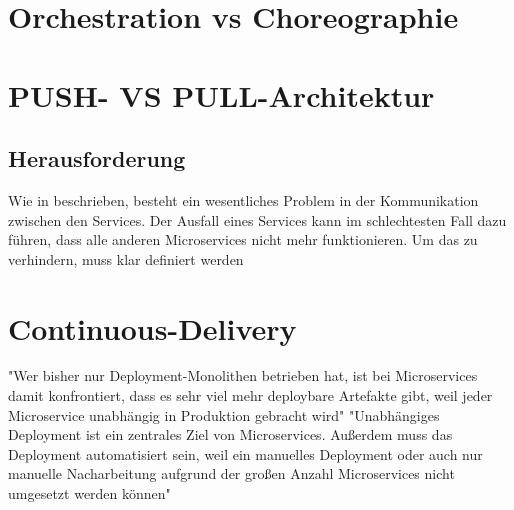 \section{Orchestration vs Choreographie}
\label{sec:orchestrationvschoreographie}

\section{PUSH- VS PULL-Architektur}
\label{sec:PushPullArchitektur}

\subsection{Herausforderung}
Wie in \cite[S. 25]{EWolff2016:Microservices} beschrieben, besteht ein wesentliches Problem in der Kommunikation zwischen den Services. Der Ausfall eines Services kann im schlechtesten Fall dazu führen, dass alle anderen Microservices nicht mehr funktionieren. Um das zu verhindern, muss klar definiert werden


\section{Continuous-Delivery}
\label{sec:ContinuousDelivery}
"Wer bisher nur Deployment-Monolithen betrieben hat, ist bei Microservices damit konfrontiert, dass es sehr viel mehr deploybare Artefakte gibt, weil jeder Microservice unabhängig in Produktion gebracht wird"\cite[S. 241]{EWolff2016:Microservices}
"Unabhängiges Deployment ist ein zentrales Ziel von Microservices. Außerdem muss das Deployment automatisiert sein, weil ein manuelles Deployment oder auch nur manuelle Nacharbeitung aufgrund der großen Anzahl Microservices nicht umgesetzt werden können"\cite[S. 256]{EWolff2016:Microservices}